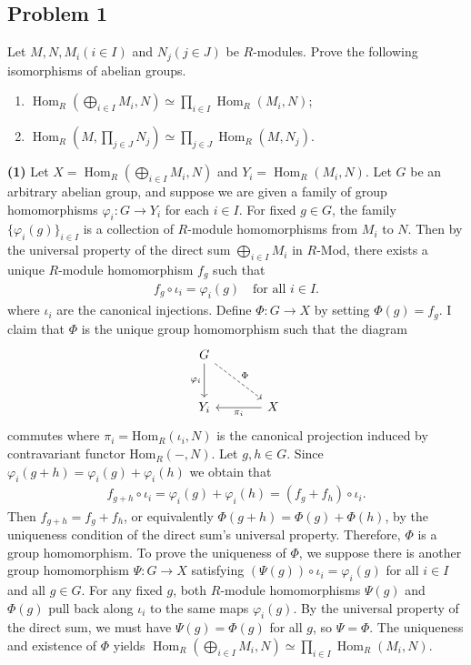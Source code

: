 \subsection*{Problem 1}
Let $M, N, M_i (i \in I)$ and $N_j (j \in J)$ be $R$-modules. Prove the following isomorphisms of abelian groups.
\begin{enumerate}
    \item[(1)] $\operatorname{Hom}_R\left(\bigoplus_{i\in I} M_i, N\right) \simeq \prod_{i\in I} \operatorname{Hom}_R(M_i, N)$;
    \item[(2)] $\operatorname{Hom}_R\left(M, \prod_{j\in J} N_j\right) \simeq \prod_{j\in J} \operatorname{Hom}_R(M, N_j)$.
\end{enumerate}
\begin{solution}
\textbf{(1)}
Let $X = \operatorname{Hom}_R\left(\bigoplus_{i\in I} M_i, N\right)$ and $Y_i = \operatorname{Hom}_R(M_i, N)$. 
Let $G$ be an arbitrary abelian group, and suppose we are given a family of group homomorphisms $\varphi_i: G \to Y_i$ for each $i \in I$. 
For fixed $g\in G$, the family $\{\varphi_i(g)\}_{i \in I}$ is a collection of $R$-module homomorphisms from $M_i$ to $N$.
Then by the universal property of the direct sum $\bigoplus_{i \in I} M_i$ in $R$-Mod, there exists a unique $R$-module homomorphism $f_g$
such that 
\begin{align*}
    f_g \circ \iota_i = \varphi_i(g) \quad \text{for all } i \in I.
\end{align*}
where $\iota_i$ are the canonical injections. Define $\Phi: G \to X$ by setting $\Phi(g) = f_g$. I claim that $\Phi$ is the unique group 
homomorphism such that the diagram
\[
\begin{tikzcd}[ampersand replacement=\&, row sep=large, column sep=large]
    G \arrow[d, "\varphi_i"'] \arrow[dr, "\Phi", dashed] \& \\
    Y_i \& X \arrow[l, "\pi_i"]
\end{tikzcd}
\]
commutes where $\pi_i=\text{Hom}_R(\iota_i,N)$ is the canonical projection induced by contravariant functor $\text{Hom}_R(-,N)$. Let $g, h \in G$. Since $\varphi_i(g+h)= \varphi_i(g)+\varphi_i(h)$ we obtain that
\begin{align*}
    f_{g+h}\circ \iota_i = \varphi_i(g)+\varphi_i(h) = (f_{g}+f_{h})\circ \iota_i.
\end{align*}
Then $f_{g+h} = f_g+f_h$, or equivalently $\Phi(g+h)=\Phi(g)+\Phi(h)$, by the uniqueness condition of the direct sum's universal property.  Therefore, $\Phi$ is a 
group homomorphism. To prove the uniqueness of $\Phi$, we suppose
there is another group homomorphism $\Psi: G \to X$ satisfying $(\Psi(g)) \circ \iota_i = \varphi_i(g)$ for all $i \in I$ and all $g \in G$. For any fixed $g$, both $R$-module homomorphisms $\Psi(g)$ and $\Phi(g)$ pull back along $\iota_i$ to the same maps $\varphi_i(g)$. 
By the universal property of the direct sum, we must have $\Psi(g) = \Phi(g)$ for all $g$, so $\Psi = \Phi$.
The uniqueness and existence of $\Phi$ yields $\operatorname{Hom}_R\left(\bigoplus_{i\in I} M_i, N\right) \simeq \prod_{i\in I} \operatorname{Hom}_R(M_i, N)$.


\end{solution}
